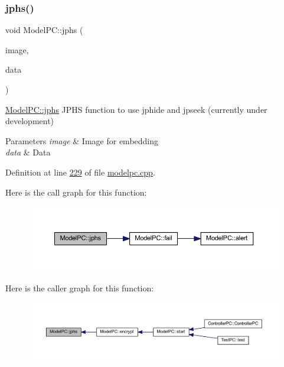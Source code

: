 \subsubsection{\texorpdfstring{jphs()}{jphs()}}
{\footnotesize\ttfamily void Model\+P\+C\+::jphs (\begin{DoxyParamCaption}\item[{Q\+Image $\ast$}]{image,  }\item[{Q\+Byte\+Array $\ast$}]{data }\end{DoxyParamCaption})\hspace{0.3cm}{\ttfamily [protected]}}



\mbox{\hyperlink{class_model_p_c_a8bee0255c09449868c7e6097afaaf0cd}{Model\+P\+C\+::jphs}} J\+P\+HS function to use jphide and jpseek (currently under development) 


\begin{DoxyParams}{Parameters}
{\em image} & Image for embedding \\
\hline
{\em data} & Data \\
\hline
\end{DoxyParams}


Definition at line \mbox{\hyperlink{modelpc_8cpp_source_l00229}{229}} of file \mbox{\hyperlink{modelpc_8cpp_source}{modelpc.\+cpp}}.

Here is the call graph for this function\+:
\nopagebreak
\begin{figure}[H]
\begin{center}
\leavevmode
\includegraphics[width=350pt]{class_model_p_c_a8bee0255c09449868c7e6097afaaf0cd_cgraph}
\end{center}
\end{figure}
Here is the caller graph for this function\+:
\nopagebreak
\begin{figure}[H]
\begin{center}
\leavevmode
\includegraphics[width=350pt]{class_model_p_c_a8bee0255c09449868c7e6097afaaf0cd_icgraph}
\end{center}
\end{figure}
\mbox{\label{class_model_p_c_a1171f9fe1550133dc9053a46b4e5bcfd}} 
